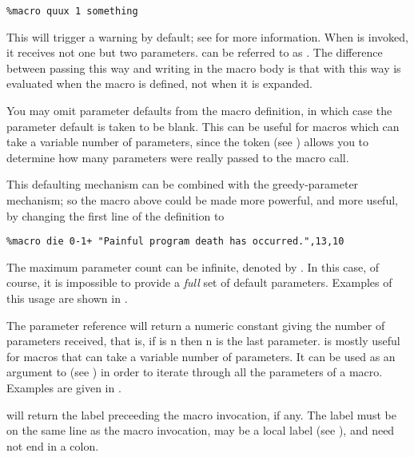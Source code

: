 \begin{lstlisting}
%macro quux 1 something
\end{lstlisting}

This will trigger a warning by default; see  for
more information.
When  is invoked, it receives not one but two parameters.
 can be referred to as . The difference
between passing  this way and writing 
in the macro body is that with this way  is evaluated
when the macro is defined, not when it is expanded.

You may omit parameter defaults from the macro definition, in which
case the parameter default is taken to be blank. This can be useful
for macros which can take a variable number of parameters, since the
 token (see ) allows you to
determine how many parameters were really passed to the macro call.

This defaulting mechanism can be combined with the greedy-parameter
mechanism; so the  macro above could be made more powerful,
and more useful, by changing the first line of the definition to

\begin{lstlisting}
%macro die 0-1+ "Painful program death has occurred.",13,10
\end{lstlisting}

The maximum parameter count can be infinite, denoted by \code{*}. In
this case, of course, it is impossible to provide a \emph{full} set of
default parameters. Examples of this usage are shown in
.


The parameter reference  will return a numeric constant giving the
number of parameters received, that is, if  is n then \code{\%}n
is the last parameter.  is mostly useful for macros that can take a variable
number of parameters. It can be used as an argument to 
(see ) in order to iterate through all the parameters
of a macro. Examples are given in .


 will return the label preceeding the macro invocation, if any. The
label must be on the same line as the macro invocation, may be a local label
(see ), and need not end in a colon.

